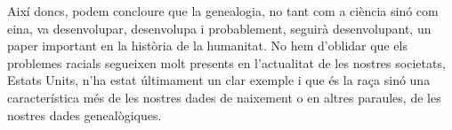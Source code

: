     Així doncs, podem concloure que la genealogia, no tant com a ciència sinó com eina, va desenvolupar, desenvolupa i probablement, seguirà desenvolupant, un paper important en la història de la humanitat. No hem d’oblidar que els problemes racials segueixen molt presents en l'actualitat de les nostres societats, Estats Units, n'ha estat últimament un clar exemple i que és la raça sinó una característica més de les nostres dades de naixement o en altres paraules, de les nostres dades genealògiques.
